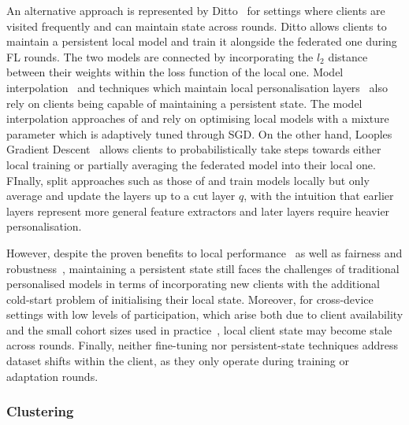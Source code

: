 An alternative approach is represented by Ditto~\citep{Ditto} for settings where clients are visited frequently and can maintain state across rounds. Ditto allows clients to maintain a persistent local model and train it alongside the federated one during FL rounds. The two models are connected by incorporating the $l_2$ distance between their weights within the loss function of the local one.  Model interpolation~\citep{ThreeApproachesMansour,AdaptivePersonalisedFederatedLearning,FederatedLearningMixtureOfGlobalAndLocal} and techniques which maintain local personalisation layers~\citep{FlWithPersonalisationLayers,FedSplitBert} also rely on clients being capable of maintaining a persistent state. The model interpolation approaches of \citet{ThreeApproachesMansour} and \citet{AdaptivePersonalisedFederatedLearning} rely on optimising local models with a mixture parameter which is adaptively tuned through SGD. On the other hand, Looples Gradient Descent~\citep{FederatedLearningMixtureOfGlobalAndLocal} allows clients to probabilistically take steps towards either local training or partially averaging the federated model into their local one. FInally, split approaches such as those of \citet{FlWithPersonalisationLayers} and \citet{FedSplitBert} train models locally but only average and update the layers up to a cut layer $q$, with the intuition that earlier layers represent more general feature extractors and later layers require heavier personalisation.

However, despite the proven benefits to local performance~\citep{FlWithPersonalisationLayers,AdaptivePersonalisedFederatedLearning} as well as fairness and robustness~\citep{Ditto}, maintaining a persistent state still faces the challenges of traditional personalised models in terms of incorporating new clients with the additional cold-start problem of initialising their local state. Moreover, for cross-device settings with low levels of participation, which arise both due to client availability and the small cohort sizes used in practice~\citep{ScaleSystemDesign,LargeCohorts}, local client state may become stale across rounds. Finally, neither fine-tuning nor persistent-state techniques address dataset shifts within the client, as they only operate during training or adaptation rounds.

\subsubsection{Clustering}

